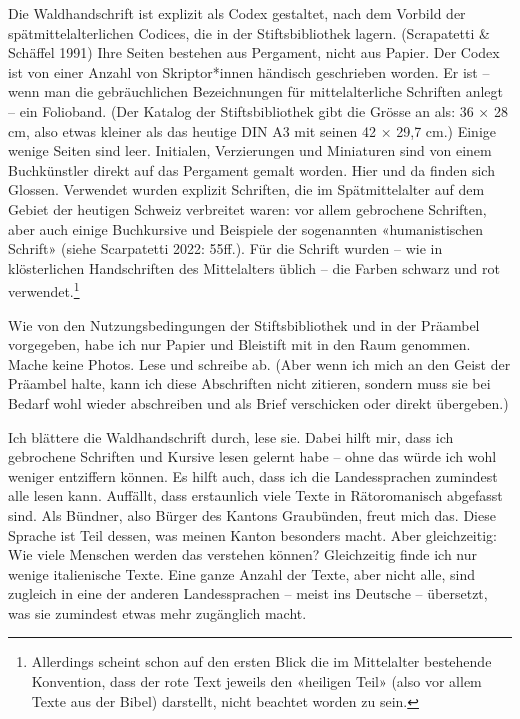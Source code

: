 \documentclass[a4paper,
fontsize=11pt,
oneside,
numbers=noperiodatend,
parskip=half-,
bibliography=totoc,
final
]{scrartcl}
\begin{document}
Die Waldhandschrift ist explizit als Codex gestaltet, nach dem Vorbild
der spätmittelalterlichen Codices, die in der Stiftsbibliothek lagern.
(Scrapatetti \& Schäffel 1991) Ihre Seiten bestehen aus Pergament, nicht
aus Papier. Der Codex ist von einer Anzahl von Skriptor*innen händisch
geschrieben worden. Er ist -- wenn man die gebräuchlichen Bezeichnungen
für mittelalterliche Schriften anlegt -- ein Folioband. (Der Katalog der
Stiftsbibliothek gibt die Grösse an als: 36 × 28 cm, also etwas kleiner
als das heutige DIN A3 mit seinen 42 × 29,7 cm.) Einige wenige Seiten
sind leer. Initialen, Verzierungen und Miniaturen sind von einem
Buchkünstler direkt auf das Pergament gemalt worden. Hier und da finden
sich Glossen. Verwendet wurden explizit Schriften, die im
Spätmittelalter auf dem Gebiet der heutigen Schweiz verbreitet waren:
vor allem gebrochene Schriften, aber auch einige Buchkursive und
Beispiele der sogenannten «humanistischen Schrift» (siehe Scarpatetti
2022: 55ff.). Für die Schrift wurden -- wie in klösterlichen
Handschriften des Mittelalters üblich -- die Farben schwarz und rot
verwendet.\footnote{Allerdings scheint schon auf den ersten Blick die im
  Mittelalter bestehende Konvention, dass der rote Text jeweils den
  «heiligen Teil» (also vor allem Texte aus der Bibel) darstellt, nicht
  beachtet worden zu sein.}

Wie von den Nutzungsbedingungen der Stiftsbibliothek und in der Präambel
vorgegeben, habe ich nur Papier und Bleistift mit in den Raum genommen.
Mache keine Photos. Lese und schreibe ab. (Aber wenn ich mich an den
Geist der Präambel halte, kann ich diese Abschriften nicht zitieren,
sondern muss sie bei Bedarf wohl wieder abschreiben und als Brief
verschicken oder direkt übergeben.)

Ich blättere die Waldhandschrift durch, lese sie. Dabei hilft mir, dass
ich gebrochene Schriften und Kursive lesen gelernt habe -- ohne das
würde ich wohl weniger entziffern können. Es hilft auch, dass ich die
Landessprachen zumindest alle lesen kann. Auffällt, dass erstaunlich
viele Texte in Rätoromanisch abgefasst sind. Als Bündner, also Bürger
des Kantons Graubünden, freut mich das. Diese Sprache ist Teil dessen,
was meinen Kanton besonders macht. Aber gleichzeitig: Wie viele Menschen
werden das verstehen können? Gleichzeitig finde ich nur wenige
italienische Texte. Eine ganze Anzahl der Texte, aber nicht alle, sind
zugleich in eine der anderen Landessprachen -- meist ins Deutsche --
übersetzt, was sie zumindest etwas mehr zugänglich macht.
\end{document}
